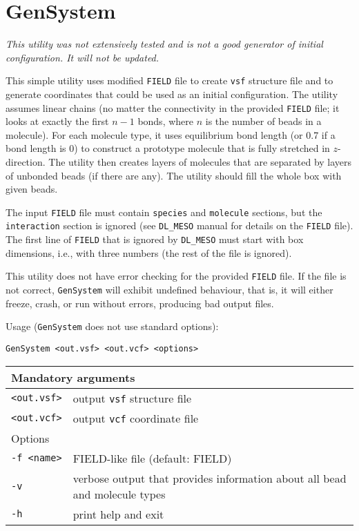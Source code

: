 \section{GenSystem} \label{sec:GenSystem}

\textit{This utility was not extensively tested and is not a good generator
of initial configuration. It will not be updated.}

This simple utility uses modified \texttt{FIELD} file to create
\texttt{vsf} structure file and to generate coordinates that could be used
as an initial configuration. The utility assumes linear chains (no matter
the connectivity in the provided \texttt{FIELD} file; it looks at exactly
the first $n-1$ bonds, where $n$ is the number of beads in a molecule). For
each molecule type, it uses equilibrium bond length (or 0.7 if a bond
length is 0) to construct a prototype molecule that is fully stretched in
$z$-direction.  The utility then creates layers of molecules that are
separated by layers of unbonded beads (if there are any). The utility
should fill the whole box with given beads.

The input \texttt{FIELD} file must contain \texttt{species} and
\texttt{molecule} sections, but the \texttt{interaction} section is ignored
(see \texttt{DL\_MESO} manual for details on the \texttt{FIELD} file). The
first line of \texttt{FIELD} that is ignored by \texttt{DL\_MESO} must
start with box dimensions, i.e., with three numbers (the rest of the file
is ignored).

This utility does not have error checking for the provided \texttt{FIELD}
file. If the file is not correct, \texttt{GenSystem} will exhibit
undefined behaviour, that is, it will either freeze, crash, or run without
errors, producing bad output files.

Usage (\texttt{GenSystem} does not use standard options):

\vspace{1em}
\noindent
\texttt{GenSystem <out.vsf> <out.vcf> <options>}

\noindent
\begin{longtable}{p{}p{}}
  \toprule
  \multicolumn{2}{l}{Mandatory arguments} \\
  \midrule
  \texttt{<out.vsf>} & output \texttt{vsf} structure file \\
  \texttt{<out.vcf>} & output \texttt{vcf} coordinate file \\
  \toprule
  \multicolumn{2}{l}{Options} \\
  \midrule
  \texttt{-f <name>} & FIELD-like file (default: FIELD)\\
  \texttt{-v}        & verbose output that provides information about all
    bead and molecule types \\
  \texttt{-h}        & print help and exit \\
  \bottomrule
\end{longtable}
